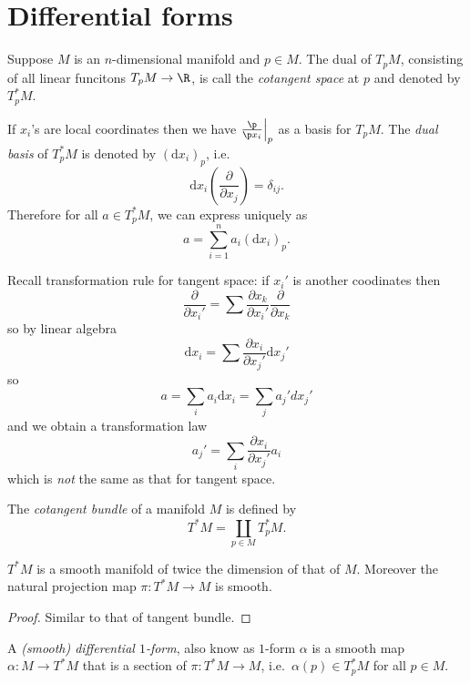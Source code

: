 \documentclass[a4paper]{article}
\begin{document}
\section{Differential forms}

\begin{definition}
  Suppose \(M\) is an \(n\)-dimensional manifold and \(p \in M\). The dual of \(T_pM\), consisting of all linear funcitons \(T_pM \to \R\), is call the \emph{cotangent space} at \(p\) and denoted by \(T_p^*M\).
\end{definition}
If \(x_i\)'s are local coordinates then we have \(\frac{\p}{\p x_i}\Big|_p\) as a basis for \(T_pM\). The \emph{dual basis} of \(T_p^*M\) is denoted by \((\mathrm d x_i)_p\), i.e.
\[
  \mathrm dx_i(\frac{\partial  }{\partial x_j}) = \delta_{ij}.
\]
Therefore for all \(a \in T_p^*M\), we can express uniquely as
\[
  a = \sum_{i = 1}^n a_i (\mathrm dx_i)_p.
\]

Recall transformation rule for tangent space: if \(x_i'\) is another coodinates then
\[
  \frac{\partial  }{\partial x_i'} = \sum \frac{\partial x_k}{\partial x_i'} \frac{\partial  }{\partial x_k}
\]
so by linear algebra
\[
  \mathrm dx_i = \sum \frac{\partial x_i}{\partial x_j'} \mathrm d x_j'
\]
so
\[
  a = \sum_i a_i \mathrm dx_i = \sum_j a_j' dx_j'
\]
and we obtain a transformation law
\[
  a_j' = \sum_i \frac{\partial x_i}{\partial x_j'} a_i
\]
which is \emph{not} the same as that for tangent space.

\begin{definition}
  The \emph{cotangent bundle} of a manifold \(M\) is defined by
  \[
    T^*M = \coprod_{p \in M} T^*_pM.
  \]
\end{definition}

\begin{theorem}
  \(T^*M\) is a smooth manifold of twice the dimension of that of \(M\). Moreover the natural projection map \(\pi: T^*M \to M\) is smooth.
\end{theorem}

\begin{proof}
  Similar to that of tangent bundle.
\end{proof}

\begin{definition}
  A \emph{(smooth) differential \(1\)-form}, also know as \(1\)-form \(\alpha\) is a smooth map \(\alpha: M \to T^*M\) that is a section of \(\pi: T^*M \to M\), i.e.\ \(\alpha(p) \in T_p^*M\) for all \(p \in M\).
\end{definition}
\end{document}
